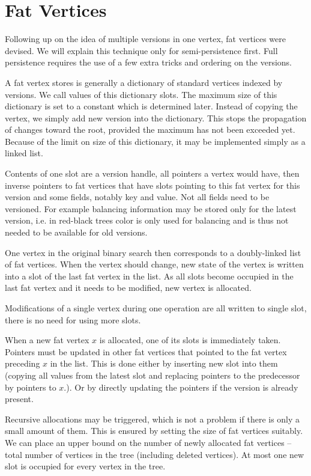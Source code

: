 

\section{Fat Vertices}

Following up on the idea of multiple versions in one vertex, fat vertices were devised. We will explain this technique only for semi-persistence first. Full persistence requires the use of a few extra tricks and ordering on the versions.

A fat vertex stores is generally a dictionary of standard vertices indexed by versions. We call values of this dictionary slots. The maximum size of this dictionary is set to a constant which is determined later. Instead of copying the vertex, we simply add new version into the dictionary. This stops the propagation of changes toward the root, provided the maximum has not been exceeded yet. Because of the limit on size of this dictionary, it may be implemented simply as a linked list.

Contents of one slot are a version handle, all pointers a vertex would have, then inverse pointers to fat vertices that have slots pointing to this fat vertex for this version and 
some fields, notably key and value. Not all fields need to be versioned. For example balancing information may be stored only for the latest version, i.e. in red-black trees color is only used for balancing and is thus not needed to be available for old versions. 

One vertex in the original binary search then corresponds to a doubly-linked list of fat vertices. When the vertex should change, new state of the vertex is written into a slot of the last fat vertex in the list. As all slots become occupied in the last fat vertex and it needs to be modified, new vertex is allocated.

Modifications of a single vertex during one operation are all written to single slot, there is no need for using more slots.

When a new fat vertex $x$ is allocated, one of its slots is immediately taken. Pointers must be updated in other fat vertices that pointed to the fat vertex preceding $x$ in the list. This is done either by inserting new slot into them (copying all values from the latest slot and replacing pointers to the predecessor by pointers to $x$.). Or by directly updating the pointers if the version is already present. 

Recursive allocations may be triggered, which is not a problem if there is only a small amount of them. This is ensured by setting the size of fat vertices suitably. We can place an upper bound on the number of newly allocated fat vertices -- total number of vertices in the tree (including deleted vertices). At most one new slot is occupied for every vertex in the tree.

